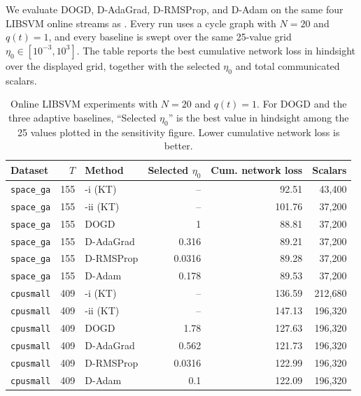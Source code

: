 {\color{blue}
We evaluate DOGD, D-AdaGrad, D-RMSProp, and D-Adam on the same four LIBSVM online streams as \algname{}.
Every run uses a cycle graph with $N=20$ and $q(t)=1$, and every baseline is swept over the same 25-value grid $\eta_0\in[10^{-3},10^3]$.
The table reports the best cumulative network loss in hindsight over the displayed grid, together with the selected $\eta_0$ and total communicated scalars.
\par}

\begin{table}[tbp]
    \color{blue}
    \centering
    \caption{Online LIBSVM experiments with $N=20$ and $q(t)=1$. For DOGD and the three adaptive baselines, ``Selected $\eta_0$'' is the best value in hindsight among the 25 values plotted in the sensitivity figure. Lower cumulative network loss is better.}
    \begin{tabular}{lrlrrr}
        \hline
        Dataset & $T$ & Method & Selected $\eta_0$ & Cum. network loss & Scalars \\
        \hline
        \texttt{space\_ga} & 155 & \algname{}-i (KT)  & --     & 92.51  & 43,400 \\
        \texttt{space\_ga} & 155 & \algname{}-ii (KT) & --     & 101.76 & 37,200 \\
        \texttt{space\_ga} & 155 & DOGD                 & 1      & 88.81  & 37,200 \\
        \texttt{space\_ga} & 155 & D-AdaGrad            & 0.316  & 89.21  & 37,200 \\
        \texttt{space\_ga} & 155 & D-RMSProp            & 0.0316 & 89.28  & 37,200 \\
        \texttt{space\_ga} & 155 & D-Adam               & 0.178  & 89.53  & 37,200 \\
        \hline
        \texttt{cpusmall} & 409 & \algname{}-i (KT)  & --     & 136.59 & 212,680 \\
        \texttt{cpusmall} & 409 & \algname{}-ii (KT) & --     & 147.13 & 196,320 \\
        \texttt{cpusmall} & 409 & DOGD                 & 1.78   & 127.63 & 196,320 \\
        \texttt{cpusmall} & 409 & D-AdaGrad            & 0.562  & 121.73 & 196,320 \\
        \texttt{cpusmall} & 409 & D-RMSProp            & 0.0316 & 122.99 & 196,320 \\
        \texttt{cpusmall} & 409 & D-Adam               & 0.1    & 122.09 & 196,320 \\
        \hline

\end{tabular}
\end{table}
